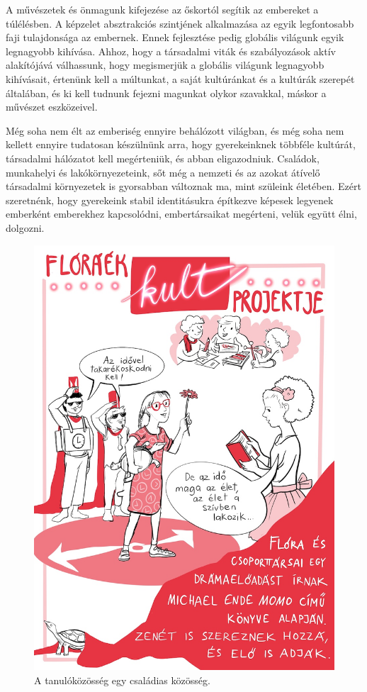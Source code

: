A művészetek és önmagunk kifejezése az őskortól segítik az embereket a
túlélésben. A képzelet absztrakciós szintjének alkalmazása az egyik
legfontosabb faji tulajdonsága az embernek. Ennek fejlesztése pedig
globális világunk egyik legnagyobb kihívása. Ahhoz, hogy a társadalmi
viták és szabályozások aktív alakítójává válhassunk, hogy megismerjük a
globális világunk legnagyobb kihívásait, értenünk kell a múltunkat, a
saját kultúránkat és a kultúrák szerepét általában, és ki kell tudnunk
fejezni magunkat olykor szavakkal, máskor a művészet eszközeivel.

Még soha nem élt az emberiség ennyire behálózott világban, és még soha
nem kellett ennyire tudatosan készülnünk arra, hogy gyerekeinknek
többféle kultúrát, társadalmi hálózatot kell megérteniük, és abban
eligazodniuk. Családok, munkahelyi és lakókörnyezeteink, sőt még a
nemzeti és az azokat átívelő társadalmi környezetek is gyorsabban
változnak ma, mint szüleink életében. Ezért szeretnénk, hogy gyerekeink
stabil identitásukra építkezve képesek legyenek emberként emberekhez
kapcsolódni, embertársaikat megérteni, velük együtt élni, dolgozni.

\begin{figure}
\centering
\includegraphics{pics/2b_kult.jpg}
\caption{A tanulóközösség egy családias közösség.}
\end{figure}

